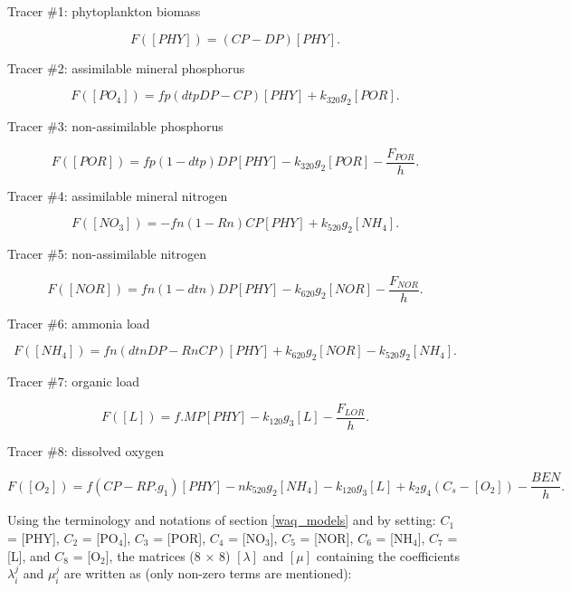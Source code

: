 Tracer $\#$1: phytoplankton biomass

\begin{equation}
  F([PHY]) = (CP-DP) [PHY].
\end{equation}

Tracer $\#$2: assimilable mineral phosphorus

\begin{equation}
  F([PO_4]) = fp(dtp DP - CP) [PHY] + k_{320} g_2 [POR].
\end{equation}

Tracer $\#$3: non-assimilable phosphorus

\begin{equation}
  F([POR]) = fp(1-dtp) DP [PHY] - k_{320} g_2 [POR] - \frac{F_{POR}}{h}.
\end{equation}

Tracer $\#$4: assimilable mineral nitrogen

\begin{equation}
  F([NO_3]) = - fn (1- Rn) CP [PHY] + k_{520} g_2 [NH_4].
\end{equation}

Tracer $\#$5: non-assimilable nitrogen

\begin{equation}
  F([NOR]) = fn (1- dtn) DP [PHY] - k_{620} g_2 [NOR] - \frac{F_{NOR}}{h}.
\end{equation}

Tracer $\#$6: ammonia load

\begin{equation}
  F([NH_4]) = fn (dtn DP - Rn CP) [PHY] + k_{620} g_2 [NOR] - k_{520} g_2 [NH_4].
\end{equation}

Tracer $\#$7: organic load

\begin{equation}
  F([L]) = f.MP [PHY] - k_{120} g_3 [L] - \frac{F_{LOR}}{h}.
\end{equation}

Tracer $\#$8: dissolved oxygen

\begin{equation}
  F([O_2]) = f (CP - RP.g_1) [PHY] - n k_{520} g_2 [NH_4] - k_{120} g_3 [L] + k_2 g_4 (C_s - [O_2]) - \frac{BEN}{h}.
\end{equation}

Using the terminology and notations of section \ref{waq_models} and by setting:
$C_1$ = [PHY], $C_2$  = [PO$_4$], $C_3$ = [POR], $C_4$ = [NO$_3$], $C_5$ = [NOR],
$C_6$ = [NH$_4$], $C_7$ = [L], and $C_8$ = [O$_2$],
the matrices (8 $\times$ 8) $[\lambda]$ and $[\mu]$ containing the coefficients
$\lambda_i^j$ and $\mu_i^j$ are written as (only non-zero terms are mentioned):\\

